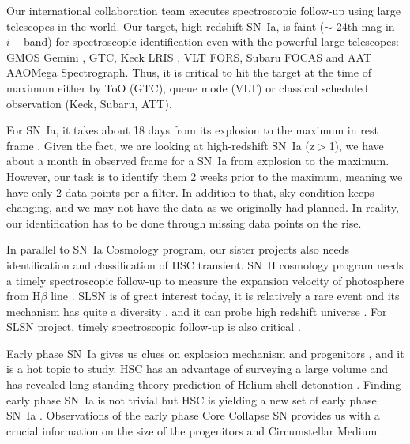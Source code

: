 \documentclass[useamsfonts]{pasj01}
\begin{document}
Our international collaboration team executes spectroscopic follow-up using large telescopes in the world.  
Our target, high-redshift SN~Ia, is faint ($\sim$ 24th mag in $i-$band) for spectroscopic identification even with the powerful large telescopes: GMOS Gemini \citep{hook04a}, GTC, Keck LRIS \citep{oke95a}, VLT FORS, Subaru FOCAS \citep{kashikawa02a} and AAT AAOMega Spectrograph.  
Thus, it is critical to hit the target at the time of maximum either by ToO (GTC), queue mode (VLT) or classical scheduled observation (Keck, Subaru, ATT).

For SN~Ia, it takes about 18 days from its explosion to the maximum in rest frame \citep{conley06a,papadogiannakis19a}.   Given the fact, we are looking at high-redshift SN~Ia (z$>$1), we have about a month in observed frame for a SN~Ia from explosion to the maximum.   However, our task is to identify them 2 weeks prior to the maximum, meaning we have only 2 data points per a filter.   In addition to that, sky condition keeps changing, and we may not have the data as we originally had planned.   In reality, our identification has to be done through missing data points on the rise.

In parallel to SN~Ia Cosmology program, our sister projects also needs identification and classification of HSC transient.   
SN~II cosmology program needs a timely spectroscopic follow-up to measure the expansion velocity of photosphere from H$\beta$ line \citep{dejaeger17a}.
SLSN is of great interest today, it is relatively a rare event\citep{quimby11a} and its mechanism has quite a diversity \citep{galyam12a,Moriya18SLSN}, and it can probe high redshift universe \citep{cooke12a}.    
For SLSN project, timely spectroscopic follow-up is also critical \citep{moriya19a,curtin19a}.

Early phase SN~Ia gives us clues on explosion mechanism \citep{maeda18a} and progenitors \citep{cao15a}, and it is a hot topic to study.
HSC has an advantage of surveying a large volume and has revealed long standing theory prediction of Helium-shell detonation \citep{Jiang2017}.
Finding early phase SN~Ia is not trivial but HSC is yielding a new set of early phase SN~Ia \citep{jiang20a}.
Observations of the early phase Core Collapse SN provides us with a crucial information on the size of the progenitors \citep{thompson03a,tominaga11a} and Circumstellar Medium \citep{forster18a}.  

\end{document}
